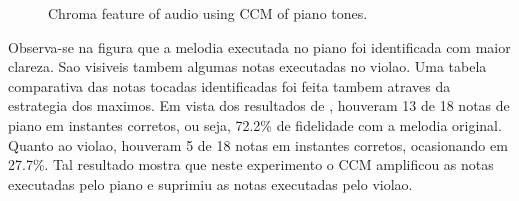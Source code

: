 \documentclass{article}
\begin{document}
	\begin{figure}[h]
	 \centerline{}
	 \caption{Chroma feature of audio using CCM of piano tones.}
	 \label{fig:2-ccm-piano}
	\end{figure}	

	Observa-se na figura  que a melodia executada no piano foi identificada com maior clareza. Sao visiveis tambem algumas notas executadas no violao. Uma tabela comparativa das notas tocadas identificadas foi feita tambem atraves da estrategia dos maximos. Em vista dos resultados de , houveram 13 de 18 notas de piano em instantes corretos, ou seja, 72.2\% de fidelidade com a melodia original. Quanto ao violao, houveram 5 de 18 notas em instantes corretos, ocasionando em 27.7\%. Tal resultado mostra que neste experimento o CCM amplificou as notas executadas pelo piano e suprimiu as notas executadas pelo violao.
\end{document}
